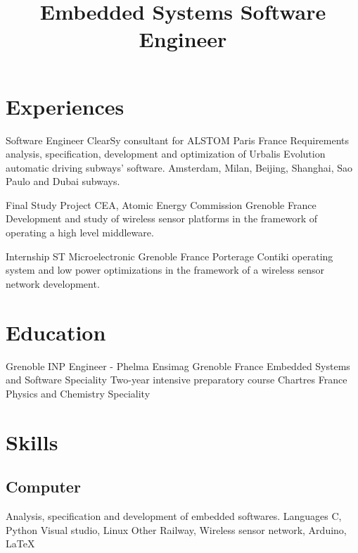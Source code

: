 \documentclass[10pt,a4paper]{moderncv}
\title{\large Embedded Systems Software Engineer}
\begin{document}
\maketitle

\section{Experiences}

	{Software Engineer}
	{ClearSy consultant for ALSTOM}
	{Paris}
	{France}
	{Requirements analysis, specification, development and optimization of Urbalis Evolution automatic driving subways' software.\newline{} Amsterdam, Milan, Beijing, Shanghai, Sao Paulo and Dubai subways.\newline{}}

	{Final Study Project}
	{CEA, Atomic Energy Commission}
	{Grenoble}
	{France}
	{Development and study of wireless sensor platforms in the framework of operating a high level middleware.\newline{}}

	{Internship}
	{ST Microelectronic}
	{Grenoble}
	{France}
	{Porterage Contiki operating system and low power optimizations in the framework of a wireless sensor network development.}

\section{Education}
	{Grenoble INP Engineer - Phelma Ensimag}
	{}
	{Grenoble}
	{France}
	{Embedded Systems and Software Speciality\newline{}}
	{Two-year intensive preparatory  course}
	{}
	{Chartres}
	{France}
	{Physics and Chemistry Speciality\newline{}}

\section{Skills}

	\subsection{Computer}

		{Analysis, specification and development of embedded softwares.\newline{}}
		{Languages}
		{C, Python}
		{Visual studio, Linux\newline{}}
		{Other}
		{Railway, Wireless sensor network, Arduino, \LaTeX} 
\end{document}
